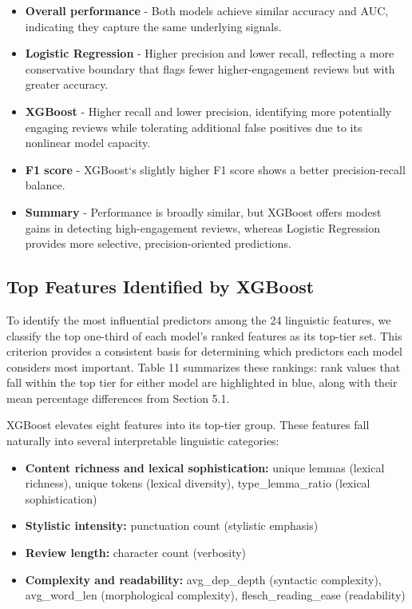 \documentclass[12pt]{article}
\begin{document}
\begin{itemize}

\item \textbf{Overall performance} - Both models achieve similar accuracy and AUC, indicating they capture the same underlying signals. 

\item \textbf{Logistic Regression} - Higher precision and lower recall, reflecting a more conservative boundary that flags fewer higher-engagement reviews but with greater accuracy.

\item \textbf{XGBoost} - Higher recall and lower precision, identifying more potentially engaging reviews while tolerating additional false positives due to its nonlinear model capacity.  

\item \textbf{F1 score} - XGBoost`s slightly higher F1 score shows a better precision-recall balance.

\item \textbf{Summary} - Performance is broadly similar, but XGBoost offers modest gains in detecting high-engagement reviews, whereas Logistic Regression provides more selective, precision-oriented predictions.  

\end{itemize}  


\subsection{Top Features Identified by XGBoost}

To identify the most influential predictors among the 24 linguistic features, we classify the top one-third of each model's ranked features as its top-tier set. This criterion provides a consistent basis for determining which predictors each model considers most important. 
Table 11 summarizes these rankings: rank values that fall within the top tier for either model are highlighted in blue, along with their mean percentage differences from Section 5.1.

XGBoost elevates eight features into its top-tier group. These features fall naturally into several interpretable linguistic categories: 

\begin{itemize}

\item \textbf{Content richness and lexical sophistication:}  
unique lemmas (lexical richness), unique tokens (lexical diversity), type\_lemma\_ratio (lexical sophistication)

\item \textbf{Stylistic intensity:}  
punctuation count (stylistic emphasis)

\item \textbf{Review length:}  
character count (verbosity)

\item \textbf{Complexity and readability:}  
avg\_dep\_depth (syntactic complexity), avg\_word\_len (morphological complexity), flesch\_reading\_ease (readability)

\end{itemize}
\end{document}
